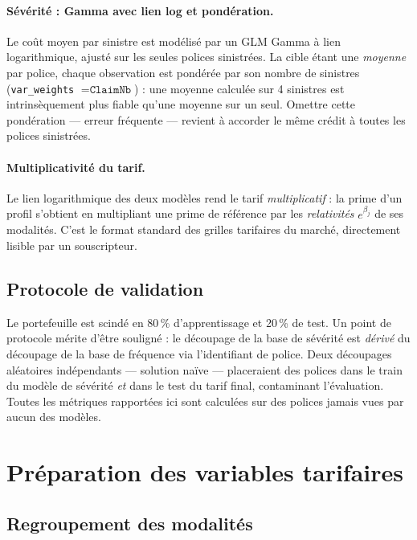 \documentclass[11pt,a4paper]{article}
\begin{document}
\paragraph{Sévérité : Gamma avec lien log et pondération.} Le coût moyen par sinistre est modélisé par un GLM Gamma à lien logarithmique, ajusté sur les seules polices sinistrées. La cible étant une \emph{moyenne} par police, chaque observation est pondérée par son nombre de sinistres (\texttt{var\_weights} $= \texttt{ClaimNb}$) : une moyenne calculée sur 4 sinistres est intrinsèquement plus fiable qu'une moyenne sur un seul. Omettre cette pondération --- erreur fréquente --- revient à accorder le même crédit à toutes les polices sinistrées.

\paragraph{Multiplicativité du tarif.} Le lien logarithmique des deux modèles rend le tarif \emph{multiplicatif} : la prime d'un profil s'obtient en multipliant une prime de référence par les \emph{relativités} $e^{\beta_j}$ de ses modalités. C'est le format standard des grilles tarifaires du marché, directement lisible par un souscripteur.

\subsection{Protocole de validation}

Le portefeuille est scindé en 80\,\% d'apprentissage et 20\,\% de test. Un point de protocole mérite d'être souligné : le découpage de la base de sévérité est \emph{dérivé} du découpage de la base de fréquence via l'identifiant de police. Deux découpages aléatoires indépendants --- solution naïve --- placeraient des polices dans le train du modèle de sévérité \emph{et} dans le test du tarif final, contaminant l'évaluation. Toutes les métriques rapportées ici sont calculées sur des polices jamais vues par aucun des modèles.

\section{Préparation des variables tarifaires}
\label{sec:prep}

\subsection{Regroupement des modalités}
\end{document}
